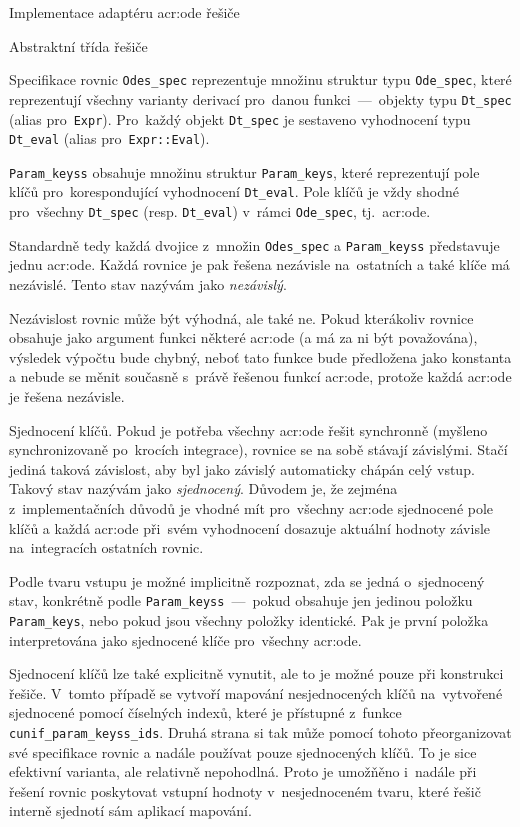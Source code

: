 \documentclass[thesis=M,czech]{FITthesis}[2012/06/26]
\newcommand{\acrlabel}[1]{acr:#1}
\newcommand{\acr}[1]{\acrshort{\acrlabel{#1}}}
\newcommand{\id}[1]{\texttt{#1}}
\newcommand{\hl}[1]{\textit{#1}}
\newcommand{\name}[1]{\hl{#1}}
\begin{document}
\begin{section}{Implementace adaptéru \acr{ode} řešiče}
\begin{subsection}{Abstraktní třída řešiče}
\begin{subsubsection}{Specifikace rovnic}
\id{Odes\_\-spec} reprezentuje množinu
struktur typu \id{Ode\_\-spec},
které reprezentují všechny varianty derivací
pro~danou funkci~---~objekty typu \id{Dt\_\-spec}
(alias pro~\id{Expr}).
Pro~každý objekt \id{Dt\_\-spec}
je sestaveno vyhodnocení typu \id{Dt\_\-eval}
(alias pro~\id{Expr::\-Eval}).

\id{Param\_\-keyss} obsahuje množinu
struktur \id{Param\_\-keys},
které reprezentují pole klíčů
pro~korespondující vyhodnocení \id{Dt\_\-eval}.
Pole klíčů je vždy shodné pro~všechny \id{Dt\_\-spec}
(resp. \id{Dt\_\-eval})
v~rámci \id{Ode\_\-spec}, tj.~\acr{ode}.

Standardně tedy každá dvojice z~množin
\id{Odes\_\-spec} a \id{Param\_\-keyss}
představuje jednu \acr{ode}.
Každá rovnice je pak řešena nezávisle na~ostatních
a také klíče má nezávislé.
Tento stav nazývám jako \name{nezávislý}.

Nezávislost rovnic může být výhodná, ale také ne.
Pokud kterákoliv rovnice obsahuje jako argument
funkci některé \acr{ode}
(a má za ni být považována),
výsledek výpočtu bude chybný,
neboť tato funkce bude předložena jako konstanta
a nebude se měnit současně s~právě řešenou funkcí \acr{ode},
protože každá \acr{ode} je řešena nezávisle.


\begin{paragraph}{Sjednocení klíčů.}\label{p:impl:ode:solver:spec:unif}
Pokud je potřeba všechny \acr{ode} řešit synchronně
(myšleno synchronizovaně po~krocích integrace),
rovnice se na sobě stávají závislými.
Stačí jediná taková závislost,
aby byl jako závislý automaticky chápán celý vstup.
Takový stav nazývám jako \name{sjednocený}.
Důvodem je, že zejména z~implementačních důvodů
je vhodné mít pro~všechny \acr{ode}
sjednocené pole klíčů
a každá \acr{ode} při~svém vyhodnocení
dosazuje aktuální hodnoty závisle
na~integracích ostatních rovnic.

Podle tvaru vstupu je možné implicitně rozpoznat,
zda se jedná o~sjednocený stav,
konkrétně podle \id{Param\_\-keyss}~---~pokud obsahuje
jen jedinou položku \id{Param\_\-keys},
nebo pokud jsou všechny položky identické.
Pak je první položka interpretována jako sjednocené klíče
pro~všechny \acr{ode}.

Sjednocení klíčů lze také explicitně vynutit,
ale to je možné pouze při konstrukci řešiče.
V~tomto případě se vytvoří mapování nesjednocených klíčů
na~vytvořené sjednocené pomocí číselných indexů,
které je přístupné z~funkce \id{cunif\_\-param\_\-keyss\_\-ids}.
Druhá strana si tak může pomocí tohoto přeorganizovat
své specifikace rovnic a nadále používat
pouze sjednocených klíčů.
To je sice efektivní varianta, ale relativně nepohodlná.
Proto je umožňěno i~nadále při řešení
rovnic poskytovat vstupní hodnoty v~nesjednoceném tvaru,
které řešič interně sjednotí sám aplikací mapování.
\end{paragraph} %


\end{subsubsection}
\end{subsection}
\end{section}
\end{document}
